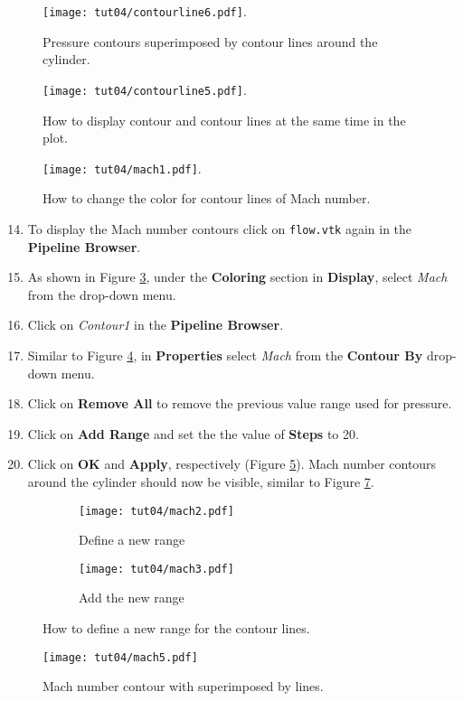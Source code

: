 \begin{figure}[ht]
    \centering
    \texttt{[image: tut04/contourline6.pdf]}.
    \caption{Pressure contours superimposed by contour lines around the cylinder.}
    \label{fig4:contourline6_4}
\end{figure}
\begin{figure}[ht]
    \centering
    \texttt{[image: tut04/contourline5.pdf]}.
    \caption{How to display contour and contour lines at the same time in the plot.}
    \label{fig4:contourline5_4}
\end{figure}
\begin{figure}[ht]
	\centering
	\texttt{[image: tut04/mach1.pdf]}.
	\caption{How to change the color for contour lines of Mach number.}
	\label{fig4:mach1_4}
\end{figure}
\begin{enumerate}[label=\arabic*)]
	\setcounter{enumi}{13}
	\item To display the Mach number contours click on \texttt{flow.vtk} again in the \textbf{Pipeline Browser}.
	\item As shown in Figure \ref{fig4:mach1_4}, under the \textbf{Coloring} section in \textbf{Display}, select \textit{Mach} from the drop-down menu.
	\item Click on \textit{Contour1} in the \textbf{Pipeline Browser}.
	\item Similar to Figure \ref{fig4:mach2_4 a}, in \textbf{Properties} select \textit{Mach} from the \textbf{Contour By} drop-down menu.
	\item Click on \textbf{Remove All} to remove the previous value range used for pressure.
	\item Click on \textbf{Add Range} and set the the value of \textbf{Steps} to 20. 
	\item Click on \textbf{OK} and \textbf{Apply}, respectively (Figure \ref{fig4:mach2_4 b}). Mach number contours around the cylinder should now be visible, similar to Figure \ref{fig4:mach5_4}.
\end{enumerate}
\begin{figure}[H]
    \centering
    \begin{subfigure}[b]{0.4\textwidth}
        \centering
        \texttt{[image: tut04/mach2.pdf]}
        \caption{Define a new range}
        \label{fig4:mach2_4 a}
    \end{subfigure}
    \hfill
    \begin{subfigure}[b]{.4\textwidth}
        \centering
        \texttt{[image: tut04/mach3.pdf]}
        \caption{Add the new range}
        \label{fig4:mach2_4 b}
    \end{subfigure}     
    \caption{How to define a new range for the contour lines.}
    \label{fig4:mach2_4}
\end{figure}
\begin{figure}[ht]
    \centering
    \texttt{[image: tut04/mach5.pdf]}
    \caption{Mach number contour with superimposed by lines.}
    \label{fig4:mach5_4}
\end{figure}
